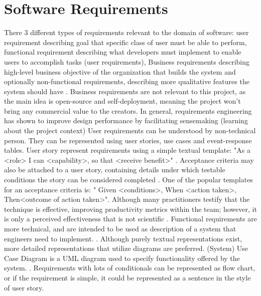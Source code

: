 \section{Software Requirements}
There 3 different types of requirements relevant to the domain of software: user requirement describing goal that specific class of user must be able to perform, functional requirement describing what developers must implement to enable users to accomplish tasks (user requirements), Business requirements describing high-level business objective of the organization that builds the system and optionally non-functional requirements, describing more qualitative features the system should have \cite{wiegers2013software}. Business requirements are not relevant to this project, as the main idea is open-source and self-deployment, meaning the project won't bring any commercial value to the creators. 
In general, requirements engineering has shown to improve design performance by facilitating sensemaking (learning about the project context)
User requirements can be understood by non-technical person. They can be represented using user stories, use cases and event-response tables. User story represent requirements using a simple textual template: "As a <role> I can <capability>, so that <receive benefit>" \cite{userStories}. Acceptance criteria may also be attached to a user story, containing details under which testable conditions the story can be considered completed \cite{Kannan2019User}. One of the popular templates for an acceptance criteria is: " Given <conditions>, When <action taken>, Then<outcome of action taken>". Although many practitioners testify that the technique is effective, improving productivity metrics within the team; however, it is only a perceived effectiveness that is not scientific \cite{userStories}.
Functional requirements are more technical, and are intended to be used as description of a system that engineers need to implement. \cite{wiegers2013software}. Although purely textual representations exist, more detailed representations that utilize diagrams are preferred. (System) Use Case Diagram is a UML diagram used to specify functionality offered by the system. \cite{malan2001functional}. Requirements with lots of conditionals can be represented as flow chart, or if the requirement is simple, it could be represented as a sentence in the style of user story. 

